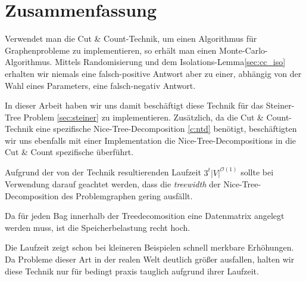 %
%
%
\chapter{Zusammenfassung}
\label{c:summary} %
Verwendet man die Cut \& Count-Technik, um einen Algorithmus für Graphenprobleme zu implementieren, so erhält man einen Monte-Carlo-Algorithmus. Mittels Randomisierung und dem Isolations-Lemma\ref{sec:cc_iso} erhalten wir niemals eine falsch-positive Antwort aber zu einer, abhängig von der Wahl eines Parameters, eine falsch-negativ Antwort. 

In dieser Arbeit haben wir uns damit beschäftigt diese Technik für das Steiner-Tree Problem \ref{sec:steiner} zu implementieren. Zusätzlich, da die Cut \& Count-Technik eine spezifische Nice-Tree-Decomposition \ref{c:ntd} benötigt, beschäftigten wir uns ebenfalls mit einer Implementation die Nice-Tree-Decompositions in die Cut \& Count spezifische überführt.

Aufgrund der von der Technik resultierenden Laufzeit $3^t |V|^{\mathcal{O}(1)}$ sollte bei Verwendung darauf geachtet werden, dass die \textit{treewidth} der Nice-Tree-Decomposition des Problemgraphen gering ausfällt.

Da für jeden Bag innerhalb der Treedecomosition eine Datenmatrix angelegt werden muss, ist die Speicherbelastung recht hoch. 

Die Laufzeit zeigt schon bei kleineren Beispielen schnell merkbare Erhöhungen. Da Probleme dieser Art in der realen Welt deutlich größer ausfallen, halten wir diese Technik nur für bedingt praxis tauglich aufgrund ihrer Laufzeit.  
